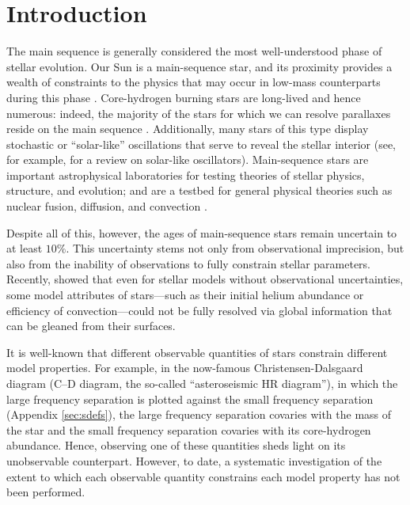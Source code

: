 %
%
%
%

%
%
%
%
%
%
%
%
%
%
%
%

%

%
%
%
%
%
%
%
%

\section{Introduction} 

The main sequence is generally considered the most well-understood phase of stellar evolution. 
Our Sun is a main-sequence star, and its proximity provides a wealth of constraints to the physics that may occur in low-mass counterparts during this phase \citep[e.g.,][]{2015SSRv..196...49B,2016lrsp...13....2b}. 
Core-hydrogen burning stars are long-lived and hence numerous: indeed, the majority of the stars for which we can resolve parallaxes reside on the main sequence \citep{2016arXiv160904172G}. 
Additionally, many stars of this type display stochastic or ``solar-like'' oscillations that serve to reveal the stellar interior (see, for example, \citealt{2013ARA&A..51..353C} for a review on solar-like oscillators).  
Main-sequence stars are important astrophysical laboratories for testing theories of stellar physics, structure, and evolution; and are a testbed for general physical theories such as nuclear fusion, diffusion, and convection \citep[e.g.,][]{1994MNRAS.269.1137B,1990ARAA..28..263S}. 

Despite all of this, however, the ages of main-sequence stars remain uncertain to at least  $10\%$. This uncertainty stems not only from observational imprecision, but also from the inability of observations to fully constrain stellar parameters.  
Recently,  showed that even for stellar models without observational uncertainties, some model attributes of stars---such as their initial helium abundance or efficiency of convection---could not be fully resolved via global information that can be gleaned from their surfaces. 


It is well-known that different observable quantities of stars constrain different model properties. For example, in the now-famous Christensen-Dalsgaard diagram (C--D diagram, the so-called ``asteroseismic HR diagram''), in which the large frequency separation is plotted against the small frequency separation (Appendix \ref{sec:sdefs}), the large frequency separation covaries with the mass of the star and the small frequency separation covaries with its core-hydrogen abundance. Hence, observing one of these quantities sheds light on its unobservable counterpart.
However, to date, a systematic investigation of the extent to which each observable quantity constrains each model property has not been performed.


